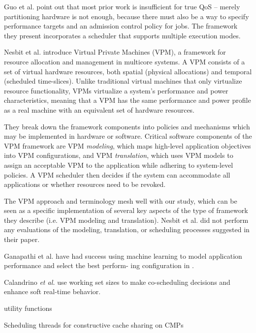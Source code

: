 Guo et al. \cite{1331730} point out that most prior work is insufficient for true QoS -- merely partitioning hardware is not enough, because there must also be a way to specify performance targets and an admission control policy for jobs.
The framework they present incorporates a scheduler that supports multiple execution modes.

Nesbit et al. \cite{1436097} introduce Virtual Private Machines (VPM), a framework for resource allocation and management in multicore systems. A VPM consists of a set of virtual hardware resources, both spatial (physical allocations) and temporal (scheduled time-slices).  Unlike traditional virtual machines that only virtualize resource functionality, VPMs virtualize a system's performance and power characteristics, meaning that a VPM has the same performance and power profile as a real machine with an equivalent set of hardware resources.

They break down the framework components into policies and mechanisms which may be implemented in hardware or software. Critical software components of the VPM framework are VPM {\em modeling}, which maps high-level application objectives into VPM configurations, and VPM {\em translation}, which uses VPM models to assign an acceptable VPM to the application while adhering to system-level policies. A VPM scheduler then decides if the system can accommodate all applications or whether resources need to be revoked.

The VPM approach and terminology mesh well with our study, which can be seen as a specific implementation of several key aspects of the type of framework they describe (i.e. VPM modeling and translation). Nesbit et al. did not perform any evaluations of the modeling, translation, or scheduling processes suggested in their paper.

\cite{aiken-mspc06}
\cite{1006707}
\cite{genbrugge-isca07}
\cite{merkel-eurosys08}

Ganapathi et al. have had success using machine learning to model application performance and select the best perform- ing configuration in \cite{Archana}.

Calandrino \emph{et al.}\cite{unc} use working set sizes to make co-scheduling decisions and enhance soft real-time behavior.

\cite{1078411}
utility functions

\cite{1380585,975344,wasserman-book}


Scheduling threads for constructive cache sharing on CMPs
\cite{1248396}
